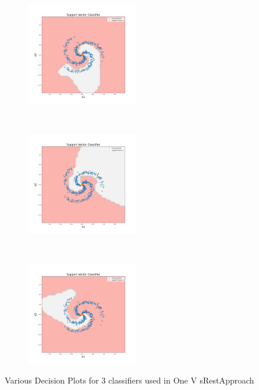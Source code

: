 \begin{figure}[!ht]
    \centering
    \begin{subfigure}[t]{0.33\textwidth}
        \centering
        \includegraphics[height=1.75in]{Dataset_1b/SVM/test4.png}
    \end{subfigure}%
    ~ 
    \begin{subfigure}[t]{0.33\textwidth}
        \centering
        \includegraphics[height=1.75in]{Dataset_1b/SVM/test5.png}
    \end{subfigure}%
    ~
    \begin{subfigure}[t]{0.33\textwidth}
        \centering
        \includegraphics[height=1.75in]{Dataset_1b/SVM/test6.png}
    \end{subfigure}%
    \caption{Various Decision Plots for 3 classifiers used in One V sRestApproach}
    \label{fig:13}
\end{figure}